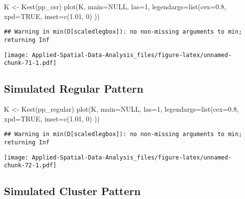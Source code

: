 \documentclass[
]{book}
\newenvironment{Shaded}{\begin{snugshade}}{\end{snugshade}}
\newcommand{\AttributeTok}[1]{\textcolor[rgb]{0.77,0.63,0.00}{#1}}
\newcommand{\ConstantTok}[1]{\textcolor[rgb]{0.00,0.00,0.00}{#1}}
\newcommand{\DecValTok}[1]{\textcolor[rgb]{0.00,0.00,0.81}{#1}}
\newcommand{\FloatTok}[1]{\textcolor[rgb]{0.00,0.00,0.81}{#1}}
\newcommand{\FunctionTok}[1]{\textcolor[rgb]{0.00,0.00,0.00}{#1}}
\newcommand{\NormalTok}[1]{#1}
\newcommand{\OtherTok}[1]{\textcolor[rgb]{0.56,0.35,0.01}{#1}}
\begin{document}
\begin{Shaded}
\begin{Highlighting}[]
\NormalTok{K }\OtherTok{\textless{}{-}} \FunctionTok{Kest}\NormalTok{(pp\_csr)}
\FunctionTok{plot}\NormalTok{(K, }\AttributeTok{main=}\ConstantTok{NULL}\NormalTok{, }\AttributeTok{las=}\DecValTok{1}\NormalTok{, }\AttributeTok{legendargs=}\FunctionTok{list}\NormalTok{(}\AttributeTok{cex=}\FloatTok{0.8}\NormalTok{, }\AttributeTok{xpd=}\ConstantTok{TRUE}\NormalTok{, }\AttributeTok{inset=}\FunctionTok{c}\NormalTok{(}\FloatTok{1.01}\NormalTok{, }\DecValTok{0}\NormalTok{) ))}
\end{Highlighting}
\end{Shaded}

\begin{verbatim}
## Warning in min(D[scaledlegbox]): no non-missing arguments to min; returning Inf
\end{verbatim}

\texttt{[image: Applied-Spatial-Data-Analysis\_files/figure-latex/unnamed-chunk-71-1.pdf]}

\hypertarget{simulated-regular-pattern-4}{%
\subsection{Simulated Regular Pattern}\label{simulated-regular-pattern-4}}

\begin{Shaded}
\begin{Highlighting}[]
\NormalTok{K }\OtherTok{\textless{}{-}} \FunctionTok{Kest}\NormalTok{(pp\_regular)}
\FunctionTok{plot}\NormalTok{(K, }\AttributeTok{main=}\ConstantTok{NULL}\NormalTok{, }\AttributeTok{las=}\DecValTok{1}\NormalTok{, }\AttributeTok{legendargs=}\FunctionTok{list}\NormalTok{(}\AttributeTok{cex=}\FloatTok{0.8}\NormalTok{, }\AttributeTok{xpd=}\ConstantTok{TRUE}\NormalTok{, }\AttributeTok{inset=}\FunctionTok{c}\NormalTok{(}\FloatTok{1.01}\NormalTok{, }\DecValTok{0}\NormalTok{) ))}
\end{Highlighting}
\end{Shaded}

\begin{verbatim}
## Warning in min(D[scaledlegbox]): no non-missing arguments to min; returning Inf
\end{verbatim}

\texttt{[image: Applied-Spatial-Data-Analysis\_files/figure-latex/unnamed-chunk-72-1.pdf]}

\hypertarget{simulated-cluster-pattern-4}{%
\subsection{Simulated Cluster Pattern}\label{simulated-cluster-pattern-4}}
\end{document}
